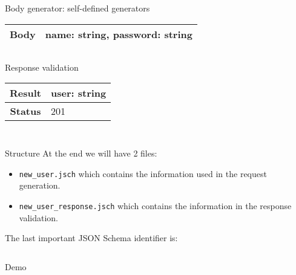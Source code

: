 \begin{frame}{Body generator: self-defined generators}
  \centering
  \begin{tabular}{| c | l |}
    \hline
    \textbf{Body} & name: string, password: string \\ \hline
  \end{tabular}
  \centering
  \inputminted{js}{./code/example1_body_custom_generators.jsch}
\end{frame}

\begin{frame}{Response validation}
  \centering
  \begin{tabular}{| c | l |}
    \hline
    \textbf{Result}    & user: string \\ \hline
    \textbf{Status}    & 201 \\ \hline
  \end{tabular}

  \centering
  \begin{minipage}{0.5\textwidth}
    \inputminted{js}{./code/example1_new_user_response.jsch}
  \end{minipage}
  \vline
  \pause
  \hspace{10pt}
  \begin{minipage}{0.4\textwidth}
    \centering
    \inputminted{js}{./code/example1_new_user_val.jsch}
  \end{minipage}

  \centering
\end{frame}

\begin{frame}{Structure}
  At the end we will have 2 files:
  \begin{itemize}
  \item \texttt{new\_user.jsch} which contains the information used in
    the request generation.
  \item \texttt{new\_user\_response.jsch} which contains the information
    in the response validation.
  \end{itemize}
  The last important JSON Schema identifier is:
  \inputminted{js}{./code/example1_targetSchema.jsch}
\end{frame}

\begin{frame}[standout]
  Demo
\end{frame}